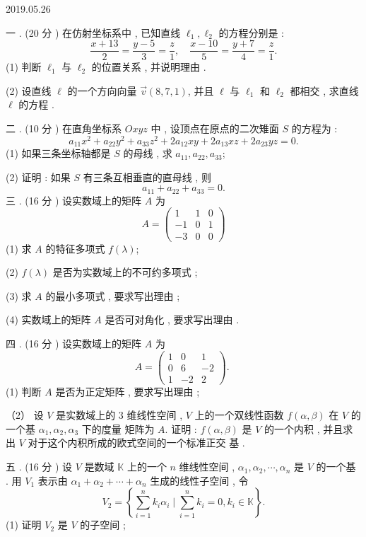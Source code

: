 \documentclass[10pt]{article}
\begin{document}
   

2019.05.26

 一 . (20  分 )  在仿射坐标系中 ,  已知直线  $\ell_{1}, \ell_{2}$  的方程分别是 :
$$
\frac{x+13}{2}=\frac{y-5}{3}=\frac{z}{1}, \quad \frac{x-10}{5}=\frac{y+7}{4}=\frac{z}{1} .
$$
(1)  判断  $\ell_{1}$  与  $\ell_{2}$  的位置关系 ,  并说明理由 .

(2)  设直线  $\ell$  的一个方向向量  $\vec{v}(8,7,1)$,  并且  $\ell$  与  $\ell_{1}$  和  $\ell_{2}$  都相交 ,  求直线  $\ell$  的方程 .

 二 . (10  分 )  在直角坐标系  $O x y z$  中 ,  设顶点在原点的二次雉面  $S$  的方程为 :
$$
a_{11} x^{2}+a_{22} y^{2}+a_{33} z^{2}+2 a_{12} x y+2 a_{13} x z+2 a_{23} y z=0 .
$$
(1)  如果三条坐标轴都是  $S$  的母线 ,  求  $a_{11}, a_{22}, a_{33}$;

(2)  证明 :  如果  $S$  有三条互相垂直的直母线 ,  则 
$$
a_{11}+a_{22}+a_{33}=0 .
$$
 三 . (16  分 )  设实数域上的矩阵  $A$  为 
$$
A=\left(\begin{array}{ccc}
1 & 1 & 0 \\
-1 & 0 & 1 \\
-3 & 0 & 0
\end{array}\right)
$$
(1)  求  $A$  的特征多项式  $f(\lambda)$;

(2) $f(\lambda)$  是否为实数域上的不可约多项式 ;

(3)  求  $A$  的最小多项式 ,  要求写出理由 ;

(4)  实数域上的矩阵  $A$  是否可对角化 ,  要求写出理由 .

 四 . (16  分 )  设实数域上的矩阵  $A$  为 
$$
A=\left(\begin{array}{ccc}
1 & 0 & 1 \\
0 & 6 & -2 \\
1 & -2 & 2
\end{array}\right) \text {. }
$$
(1)  判断  $A$  是否为正定矩阵 ,  要求写出理由 ;

（2） 设  $V$  是实数域上的  3  维线性空间 , $V$  上的一个双线性函数  $f(\alpha, \beta)$  在  $V$  的一个基  $\alpha_{1}, \alpha_{2}, \alpha_{3}$  下的度量   矩阵为  $A$.  证明 : $f(\alpha, \beta)$  是  $V$  的一个内积 ,  并且求出  $V$  对于这个内积所成的欧式空间的一个标准正交   基 .

 五 . (16  分 )  设  $V$  是数域  $\mathbb{K}$  上的一个  $n$  维线性空间 , $\alpha_{1}, \alpha_{2}, \cdots, \alpha_{n}$  是  $V$  的一个基 .  用  $V_{1}$  表示由  $\alpha_{1}+\alpha_{2}+\cdots+\alpha_{n}$  生成的线性子空间 ,  令 
$$
V_{2}=\left\{\sum_{i=1}^{n} k_{i} \alpha_{i} \mid \sum_{i=1}^{n} k_{i}=0, k_{i} \in \mathbb{K}\right\} .
$$
(1)  证明  $V_{2}$  是  $V$  的子空间 ;
\end{document}
